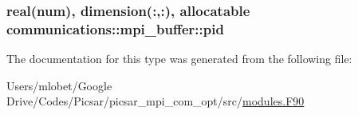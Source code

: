 \subsubsection[{\texorpdfstring{pid}{pid}}]{\setlength{\rightskip}{0pt plus 5cm}real(num), dimension(\+:,\+:), allocatable communications\+::mpi\+\_\+buffer\+::pid}\hypertarget{structcommunications_1_1mpi__buffer_ac44e9695ac6a3e8b0bec14e3293f7c34}{}\label{structcommunications_1_1mpi__buffer_ac44e9695ac6a3e8b0bec14e3293f7c34}


The documentation for this type was generated from the following file\+:\begin{DoxyCompactItemize}
\item 
Users/mlobet/\+Google Drive/\+Codes/\+Picsar/picsar\+\_\+mpi\+\_\+com\+\_\+opt/src/\hyperlink{modules_8_f90}{modules.\+F90}\end{DoxyCompactItemize}

